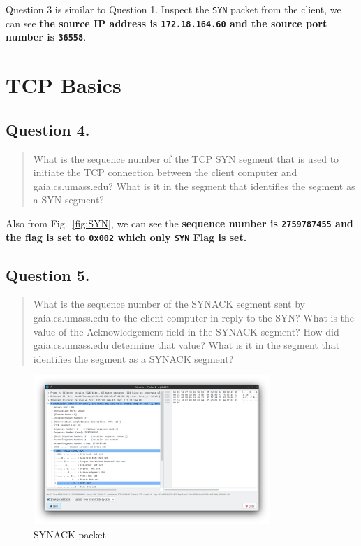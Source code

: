 \documentclass{cshwk}
\begin{document}
Question 3 is similar to Question 1. Inspect the \texttt{SYN} packet from the client, we can see \textbf{the source IP address is \texttt{172.18.164.60} and the source port number is \texttt{36558}}.

\section{TCP Basics}

\subsection*{Question 4.}
\begin{quote}
    What is the sequence number of the TCP SYN segment that is used to initiate the TCP connection between the client computer and gaia.cs.umass.edu? What is it in the segment that identifies the segment as a SYN segment?
\end{quote}

Also from Fig.~\ref{fig:SYN}, we can see the \textbf{sequence number is \texttt{2759787455} and the flag is set to \texttt{0x002} which only \texttt{SYN} Flag is set.}

\subsection*{Question 5.}
\begin{quote}
    What is the sequence number of the SYNACK segment sent by gaia.cs.umass.edu to the client computer in reply to the SYN? What is the value of the
    Acknowledgement field in the SYNACK segment? How did gaia.cs.umass.edu
    determine that value? What is it in the segment that identifies the segment as a SYNACK segment?
\end{quote}

\begin{figure}[htbp]
    \centering
    \includegraphics[width=0.8\textwidth]{./lab3-3.png}
    \caption{SYNACK packet}
    \label{fig:SYNACK}
\end{figure}
\end{document}
